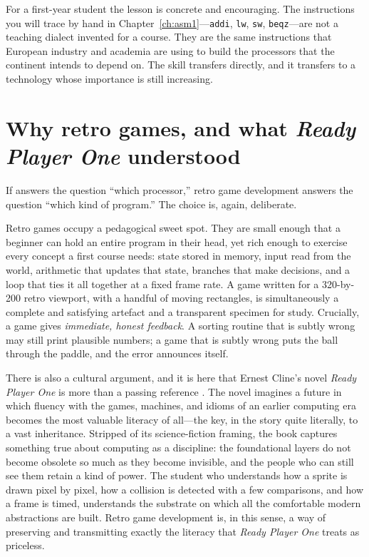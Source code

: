 For a first-year student the lesson is concrete and encouraging. The instructions
you will trace by hand in Chapter~\ref{ch:asm1}---\texttt{addi}, \texttt{lw},
\texttt{sw}, \texttt{beqz}---are not a teaching dialect invented for a course.
They are the same instructions that European industry and academia are using to
build the processors that the continent intends to depend on. The skill transfers
directly, and it transfers to a technology whose importance is still increasing.

\section{Why retro games, and what \emph{Ready Player One} understood}

If \riscv answers the question ``which processor,'' retro game development
answers the question ``which kind of program.'' The choice is, again, deliberate.

Retro games occupy a pedagogical sweet spot. They are small enough that a
beginner can hold an entire program in their head, yet rich enough to exercise
every concept a first course needs: state stored in memory, input read from the
world, arithmetic that updates that state, branches that make decisions, and a
loop that ties it all together at a fixed frame rate. A game written for a
320-by-200 retro viewport, with a handful of moving rectangles, is simultaneously
a complete and satisfying artefact and a transparent specimen for study. Crucially,
a game gives \emph{immediate, honest feedback}. A sorting routine that is subtly
wrong may still print plausible numbers; a game that is subtly wrong puts the ball
through the paddle, and the error announces itself.

There is also a cultural argument, and it is here that Ernest Cline's novel
\emph{Ready Player One} is more than a passing reference \citep{cline2011}. The
novel imagines a future in which fluency with the games, machines, and idioms of
an earlier computing era becomes the most valuable literacy of all---the key, in
the story quite literally, to a vast inheritance. Stripped of its science-fiction
framing, the book captures something true about computing as a discipline: the
foundational layers do not become obsolete so much as they become invisible, and
the people who can still see them retain a kind of power. The student who
understands how a sprite is drawn pixel by pixel, how a collision is detected with
a few comparisons, and how a frame is timed, understands the substrate on which
all the comfortable modern abstractions are built. Retro game development is, in
this sense, a way of preserving and transmitting exactly the literacy that
\emph{Ready Player One} treats as priceless.


